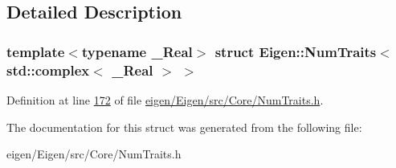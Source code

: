\subsection{Detailed Description}
\subsubsection*{template$<$typename \+\_\+\+Real$>$\newline
struct Eigen\+::\+Num\+Traits$<$ std\+::complex$<$ \+\_\+\+Real $>$ $>$}



Definition at line \hyperlink{eigen_2_eigen_2src_2_core_2_num_traits_8h_source_l00172}{172} of file \hyperlink{eigen_2_eigen_2src_2_core_2_num_traits_8h_source}{eigen/\+Eigen/src/\+Core/\+Num\+Traits.\+h}.



The documentation for this struct was generated from the following file\+:\begin{DoxyCompactItemize}
\item 
eigen/\+Eigen/src/\+Core/\+Num\+Traits.\+h\end{DoxyCompactItemize}
